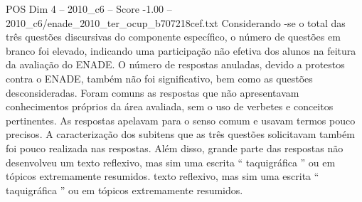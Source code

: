 \begin{textsample}{POS Dim 4 – 2010\_c6 – Score -1.00 – 2010\_c6/enade\_2010\_ter\_ocup\_b707218cef.txt}
Considerando -se o total das três questões discursivas do componente específico, o número de questões em branco foi elevado, indicando uma participação não efetiva dos alunos na feitura da avaliação do ENADE.
O número de respostas anuladas, devido a protestos contra o ENADE, também não foi significativo, bem como as questões desconsideradas.
Foram comuns as respostas que não apresentavam conhecimentos próprios da área avaliada, sem o uso de verbetes e conceitos pertinentes.
As respostas apelavam para o senso comum e usavam termos pouco precisos.
A caracterização dos subitens que as três questões solicitavam também foi pouco realizada nas respostas.
Além disso, grande parte das respostas não desenvolveu um texto reflexivo, mas sim uma escrita “ taquigráfica ” ou em tópicos extremamente resumidos. texto reflexivo, mas sim uma escrita “ taquigráfica ” ou em tópicos extremamente resumidos.

\end{textsample}
